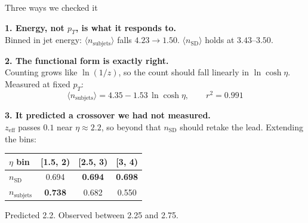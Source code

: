 \documentclass[aspectratio=169,10pt]{beamer}
\newcommand{\sdc}[1]{\textcolor{sdorange}{#1}}
\newcommand{\sjc}[1]{\textcolor{sjgreen}{#1}}
\begin{document}
\begin{frame}{Three ways we checked it}

\textbf{1. Energy, not $p_T$, is what it responds to.}\\
\footnotesize
Binned in jet energy: $\langle n_{\mathrm{subjets}}\rangle$ falls
$4.23 \rightarrow 1.50$. $\langle n_{\mathrm{SD}}\rangle$ holds at
$3.43$--$3.50$.

\vspace{1em}
\normalsize
\textbf{2. The functional form is exactly right.}\\
\footnotesize
Counting grows like $\ln(1/z)$, so the count should fall linearly in
$\ln\cosh\eta$. Measured at fixed $p_T$:
\[
\langle n_{\mathrm{subjets}}\rangle = 4.35 - 1.53\,\ln\cosh\eta,
\qquad r^2 = 0.991
\]

\vspace{0.8em}
\normalsize
\textbf{3. It predicted a crossover we had not measured.}\\
\footnotesize
$z_{\mathrm{eff}}$ passes $0.1$ near $\eta \approx 2.2$, so beyond that
$n_{\mathrm{SD}}$ should retake the lead. Extending the bins:

\centering
\begin{tabular}{lccc}
\toprule
$\eta$ bin & [1.5, 2) & [2.5, 3) & [3, 4) \\
\midrule
\sdc{$n_{\mathrm{SD}}$}      & 0.694 & \textbf{0.694} & \textbf{0.698} \\
\sjc{$n_{\mathrm{subjets}}$} & \textbf{0.738} & 0.682 & 0.550 \\
\bottomrule
\end{tabular}

\vspace{0.5em}
Predicted 2.2. Observed between 2.25 and 2.75.

\end{frame}
\end{document}
